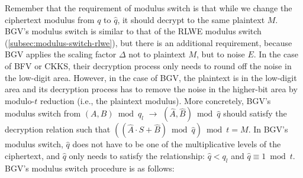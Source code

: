 Remember that the requirement of modulus switch is that while we change the ciphertext modulus from $q$ to $\hat q$, it should decrypt to the same plaintext $M$. BGV's modulus switch is similar to that of the RLWE modulus switch (\autoref{subsec:modulus-switch-rlwe}), but there is an additional requirement, because BGV applies the scaling factor $\Delta$ not to plaintext $M$, but to noise $E$. In the case of BFV or CKKS, their decryption process only needs to round off the noise in the low-digit area. However, in the case of BGV, the plaintext is in the low-digit area and its decryption process has to remove the noise in the higher-bit area by modulo-$t$ reduction (i.e., the plaintext modulus). More concretely, BGV's modulus switch from $(A, B) \bmod q_{l}$ $\rightarrow$  $(\hat{A}, \hat{B}) \bmod \hat{q}$ should satisfy the decryption relation such that $((\hat{A} \cdot S + \hat{B}) \bmod \hat{q}) \bmod t = M$. In BGV's modulus switch, $\hat{q}$ does not have to be one of the multiplicative levels of the ciphertext, and $\hat{q}$ only needs to satisfy the relationship: $\hat{q} < q_l$ and $\hat{q} \equiv 1 \bmod t$. BGV's modulus switch procedure is as follows:

$ $

